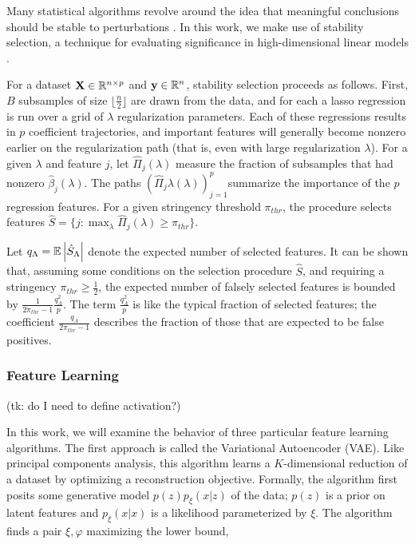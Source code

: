 Many statistical algorithms revolve around the idea that meaningful conclusions should be stable to perturbations \cite{yu2013stability}. In this work, we make use of stability selection, a technique for evaluating significance in high-dimensional linear models \cite{meinshausen2010stability}.

For a dataset $\mathbf{X}\in \mathbb{R}^{n \times p}$ and $\mathbf{y} \in
\mathbb{R}^{n}$, stability selection proceeds as follows. First, $B$ subsamples of
size $\lfloor \frac{n}{2} \rfloor$ are drawn from the data, and for each a lasso
regression is run over a grid of $\lambda$ regularization parameters. Each of
these regressions results in $p$ coefficient trajectories, and important
features will generally become nonzero earlier on the regularization path (that
is, even with large regularization $\lambda$). For a given $\lambda$ and feature
$j$, let $\hat{\Pi}_{j}\left(\lambda\right)$ measure the fraction of subsamples
that had nonzero $\hat{\beta}_j\left(\lambda\right)$. The paths
$\left(\hat{\Pi}_{j}\lambda\left(\lambda\right)\right)_{j = 1}^{p}$summarize the
importance of the $p$ regression features. For a given stringency threshold
$\pi_{thr}$, the procedure selects features $\hat{S} = \{j : \max_{\lambda}
\hat{\Pi}_{j}\left(\lambda\right) \geq \pi_{thr}\}$.

Let $q_{\Lambda} = \mathbb{E}\left|{\hat{S}_{\Lambda}}\right|$ denote the expected number of
selected features. It can be shown that, assuming some conditions on the
selection procedure $\hat{S}$, and requiring a stringency $\pi_{thr} \geq
\frac{1}{2}$, the expected number of falsely selected features is bounded by
$\frac{1}{2\pi_{thr} - 1} \frac{q_{\Lambda}^2}{p}$. The term
$\frac{q_{\Lambda}^2}{p}$ is like the typical fraction of selected features; the
coefficient $\frac{q_{\Lambda}}{2\pi_{thr} - 1}$ describes the fraction of those
that are expected to be false positives.

\subsubsection{Feature Learning}

(tk: do I need to define activation?)

In this work, we will examine the behavior of three particular feature learning algorithms. The first approach is called the Variational Autoencoder (VAE). Like principal components analysis, this algorithm learns a $K$-dimensional reduction of a dataset by optimizing a reconstruction objective. Formally, the algorithm first posits some generative model $p\left(z\right)p_{\xi}\left(x \vert z\right)$ of the data; $p\left(z\right)$ is a prior on latent features and $p_{\xi}\left(x \vert x\right)$ is a likelihood parameterized by $\xi$. The algorithm finds a pair $\xi, \varphi$ maximizing the lower bound,

